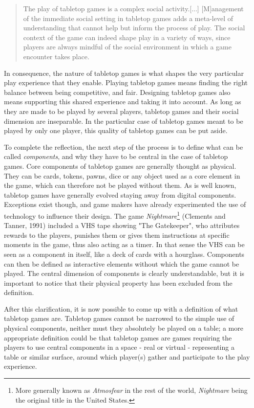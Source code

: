 \begin{quotation}
The play of tabletop games is a complex social activity.[...] [M]anagement of the immediate social setting in tabletop games adds a meta-level of understanding that cannot help but inform the process of play. The social context of the game can indeed shape play in a variety of ways, since players are always mindful of the social environment in which a game encounter takes place.
\end{quotation}
In consequence, the nature of tabletop games is what shapes the very particular play experience that they enable. Playing tabletop games means finding the right balance between being competitive, and fair. Designing tabletop games also means supporting this shared experience and taking it into account. As long as they are made to be played by several players, tabletop games and their social dimension are inseparable. In the particular case of tabletop games meant to be played by only one player, this quality of tabletop games can be put aside.

To complete the reflection, the next step of the process is to define what can be called \textit{components}, and why they have to be central in the case of tabletop games. Core components of tabletop games are generally thought as physical. They can be cards, tokens, pawns, dice or any object used as a core element in the game, which can therefore not be played without them. As is well known, tabletop games have generally evolved staying away from digital components. Exceptions exist though, and game makers have already experimented the use of technology to influence their design. The game \textit{Nightmare}\footnote{More generally known as \textit{Atmosfear} in the rest of the world, \textit{Nightmare} being the original title in the United States.} (Clements and Tanner, 1991)\cite{game:atmo} included a VHS tape showing "The Gatekeeper", who attributes rewards to the players, punishes them or gives them instructions at specific moments in the game, thus also acting as a timer. In that sense the VHS can be seen as a component in itself, like a deck of cards with a hourglass.
Components can then be defined as interactive elements without which the game cannot be played. The central dimension of components is clearly understandable, but it is important to notice that their physical property has been excluded from the definition.

After this clarification, it is now possible to come up with a definition of what tabletop games are. Tabletop games cannot be narrowed to the simple use of physical components, neither must they absolutely be played on a table; a more appropriate definition could be that tabletop games are games requiring the players to use central components in a space - real or virtual - representing a table or similar surface, around which player(s) gather and participate to the play experience.
